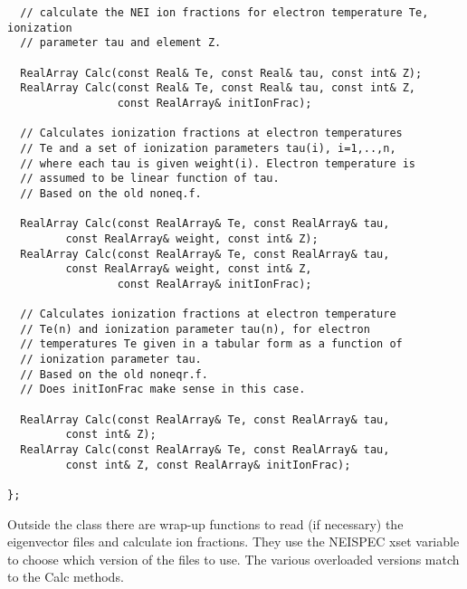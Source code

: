 \documentclass[11pt]{book}
\begin{document}
\begin{verbatim}
  // calculate the NEI ion fractions for electron temperature Te, ionization
  // parameter tau and element Z.

  RealArray Calc(const Real& Te, const Real& tau, const int& Z);
  RealArray Calc(const Real& Te, const Real& tau, const int& Z, 
                 const RealArray& initIonFrac);

  // Calculates ionization fractions at electron temperatures
  // Te and a set of ionization parameters tau(i), i=1,..,n,
  // where each tau is given weight(i). Electron temperature is
  // assumed to be linear function of tau.
  // Based on the old noneq.f.

  RealArray Calc(const RealArray& Te, const RealArray& tau, 
		 const RealArray& weight, const int& Z);
  RealArray Calc(const RealArray& Te, const RealArray& tau, 
		 const RealArray& weight, const int& Z, 
                 const RealArray& initIonFrac);

  // Calculates ionization fractions at electron temperature
  // Te(n) and ionization parameter tau(n), for electron 
  // temperatures Te given in a tabular form as a function of 
  // ionization parameter tau.
  // Based on the old noneqr.f.
  // Does initIonFrac make sense in this case.

  RealArray Calc(const RealArray& Te, const RealArray& tau, 
		 const int& Z);
  RealArray Calc(const RealArray& Te, const RealArray& tau, 
		 const int& Z, const RealArray& initIonFrac);

};
\end{verbatim}

Outside the class there are wrap-up functions to read (if necessary)
the eigenvector files and calculate ion fractions. They use the
NEISPEC xset variable to choose which version of the files to
use. The various overloaded versions match to the Calc methods.
\end{document}
